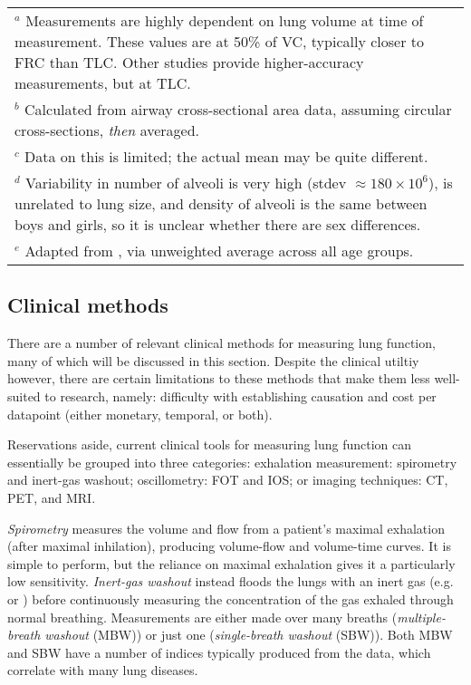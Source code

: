 \begin{table}[ht]
    \renewcommand{\arraystretch}{1}
    \footnotesize{
        \begin{tabular}{p{14.5cm}}
            $^a$ Measurements are highly dependent on lung volume at time of
            measurement.\cite{Hoffstein1986} These values are at 50\% of VC, typically closer to FRC
            than TLC. Other studies provide higher-accuracy measurements, but at TLC.%
            \cite{SheelEtAl2009} \\
        $^b$ Calculated from airway cross-sectional area data, assuming circular cross-sections,
            \textit{then} averaged. \\
        $^c$ Data on this is limited; the actual mean may be quite different. \\
        $^d$ Variability in number of alveoli is very high (stdev $\approx 180 \times 10^6$), is
            unrelated to lung size, and density of alveoli is the same between boys and girls, so it
            is unclear whether there are sex differences. \cite{OchsEtAl2004, Thurlbeck1982} \\
        $^e$ Adapted from \cite{NederEtAl1999}, via unweighted average across all age groups. \\
        \end{tabular}
    }
\end{table}

\subsection{Clinical methods} \label{sec:clinical-methods}

There are a number of relevant clinical methods for measuring lung function, many of which will be
discussed in this section. Despite the clinical utiltiy however, there are certain limitations to
these methods that make them less well-suited to research, namely: difficulty with establishing
causation and cost per datapoint (either monetary, temporal, or both).

Reservations aside, current clinical tools for measuring lung function can essentially be grouped
into three categories: exhalation measurement: spirometry and inert-gas washout; oscillometry: FOT
and IOS; or imaging techniques: CT, PET, and MRI.

\textit{Spirometry} measures the volume and flow from a patient's maximal exhalation (after maximal
inhilation), producing volume-flow and volume-time curves. It is simple to perform, but the reliance
on maximal exhalation gives it a particularly low sensitivity. \textit{Inert-gas washout} instead
floods the lungs with an inert gas (e.g.~ or ) before continuously measuring the
concentration of the gas exhaled through normal breathing. Measurements are either made over many
breaths (\textit{multiple-breath washout} (MBW)) or just one (\textit{single-breath washout} (SBW)).
Both MBW and SBW have a number of indices typically produced from the data, which correlate with
many lung diseases.


